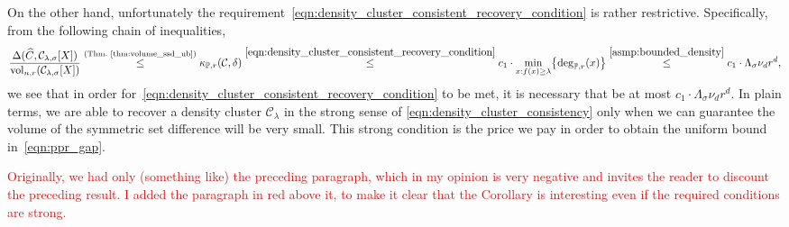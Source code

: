 \documentclass[11pt,twoside]{article}
\newcommand{\1}{\mathbf{1}}
\newcommand{\mc}[1]{\mathcal{#1}}
\newcommand{\Pbb}{\mathbb{P}}
\newcommand{\wh}[1]{\widehat{#1}}
\newcommand{\vol}{\mathrm{vol}}
\begin{document}
On the other hand, unfortunately the requirement~\eqref{eqn:density_cluster_consistent_recovery_condition} is rather restrictive. Specifically, from the following chain of inequalities,
\begin{equation*}
\frac{\Delta(\wh{C}, \mc{C}_{\lambda,\sigma}[X])}{\vol_{n,r}(\mc{C}_{\lambda,\sigma}[X])} \overset{(\textrm{Thm.~\ref{thm:volume_ssd_ub}})}{\leq} \kappa_{\Pbb,r}(\mc{C},\delta) \overset{\eqref{eqn:density_cluster_consistent_recovery_condition}}{\leq} c_1 \cdot \min_{x: f(x) \geq \lambda} \bigl\{\deg_{\Pbb,r}(x)\bigr\} \overset{\ref{asmp:bounded_density}}{\leq} c_1 \cdot \Lambda_{\sigma} \nu_d r^d,
\end{equation*}
we see that in order for~\eqref{eqn:density_cluster_consistent_recovery_condition} to be met, it is necessary that \smash{$\Delta(\wh{C}, \mc{C}_{\lambda,\sigma}[X])/\vol_{n,r}(\mc{C}_{\lambda,\sigma}[X])$} be at most $c_1 \cdot \Lambda_{\sigma} \nu_d r^d$. In plain terms, we 
are able to recover a density cluster $\mc{C}_{\lambda}$ in the strong sense of
\eqref{eqn:density_cluster_consistency} only when we can guarantee the volume of the symmetric set difference will be very small. This strong condition is
the price we pay in order to obtain the uniform bound in~\eqref{eqn:ppr_gap}.\vspace{1 mm}

\textcolor{red}{Originally, we had only (something like) the preceding paragraph, which in my opinion is very negative and invites the reader to discount the preceding result. I added the paragraph in red above it, to make it clear that the Corollary is interesting even if the required conditions are strong.}
\end{document}
